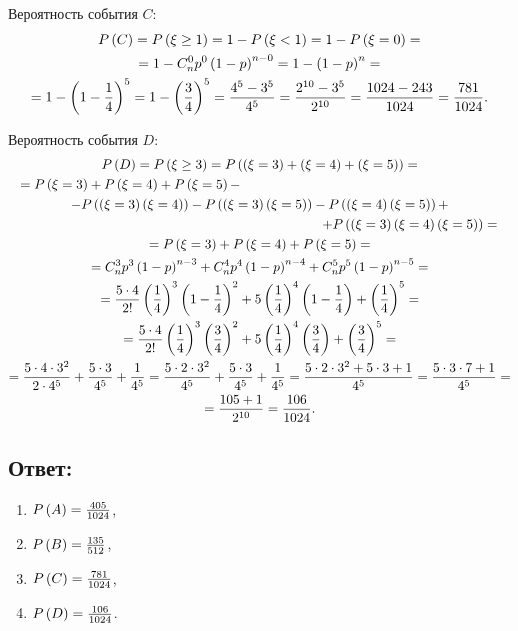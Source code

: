 Вероятность события $C$:
\begin{multline}
    P \left ( C \right )
    = P \left ( \xi \ge 1 \right )
    = 1 - P \left ( \xi < 1 \right )
    = 1 - P \left ( \xi = 0 \right ) = \\
    = 1 - C_n^0 p^0 \left ( 1 - p \right )^{n-0}
    = 1 - \left ( 1 - p \right )^n = \\
    = 1 - \left ( 1 - \frac{1}{4} \right )^5
    = 1 - \left ( \frac{3}{4} \right )^5
    = \frac{4^5 - 3^5}{4^5}
    = \frac{2^{10} - 3^5}{2^{10}}
    = \frac{1024 - 243}{1024}
    = \frac{781}{1024} .
\end{multline}

Вероятность события $D$:
\begin{multline}
    \probability{D}
    = \probability{\xi \ge 3}
    = \probability{\left ( \xi = 3 \right ) + \left ( \xi = 4 \right ) + \left ( \xi = 5 \right )} = \\
    \shoveleft{= \probability{\xi = 3} + \probability{\xi = 4} + \probability{\xi = 5} -} \\
        - \probability{\left ( \xi = 3 \right ) \left ( \xi = 4 \right )}
        - \probability{\left ( \xi = 3 \right ) \left ( \xi = 5 \right )}
        - \probability{\left ( \xi = 4 \right ) \left ( \xi = 5 \right )} + \\
    \shoveright{+ \probability{\left ( \xi = 3 \right ) \left ( \xi = 4 \right ) \left ( \xi = 5 \right )} =} \\
    = \probability{\xi = 3} + \probability{\xi = 4} + \probability{\xi = 5} = \\
    = C_n^3 p^3 \left ( 1 - p \right )^{n-3} + C_n^4 p^4 \left ( 1 - p \right )^{n-4} + C_n^5 p^5 \left ( 1 - p \right )^{n-5} = \\
    = \frac{5 \cdot 4}{2!} \left ( \frac{1}{4} \right )^3 \left ( 1 - \frac{1}{4} \right )^2
        + 5 \left ( \frac{1}{4} \right )^4 \left ( 1 - \frac{1}{4} \right )
        + \left ( \frac{1}{4} \right )^5 = \\
    = \frac{5 \cdot 4}{2!} \left ( \frac{1}{4} \right )^3 \left ( \frac{3}{4} \right )^2
        + 5 \left ( \frac{1}{4} \right )^4 \left ( \frac{3}{4} \right )
        + \left ( \frac{3}{4} \right )^5 = \\
    = \frac{5 \cdot 4 \cdot 3^2}{2 \cdot 4^5} + \frac{5 \cdot 3}{4^5} + \frac{1}{4^5}
    = \frac{5 \cdot 2 \cdot 3^2}{4^5} + \frac{5 \cdot 3}{4^5} + \frac{1}{4^5}
    = \frac{5 \cdot 2 \cdot 3^2 + 5 \cdot 3 + 1}{4^5}
    = \frac{5 \cdot 3 \cdot 7 + 1}{4^5} = \\
    = \frac{105 + 1}{2^{10}}
    = \frac{106}{1024} .
\end{multline}

\subsection*{Ответ:}
\begin{enumerate}
    \item $P \left ( A \right ) = \frac{405}{1024}$,
    \item $P \left ( B \right ) = \frac{135}{512}$,
    \item $P \left ( C \right ) = \frac{781}{1024}$,
    \item $P \left ( D \right ) = \frac{106}{1024}$.
\end{enumerate}